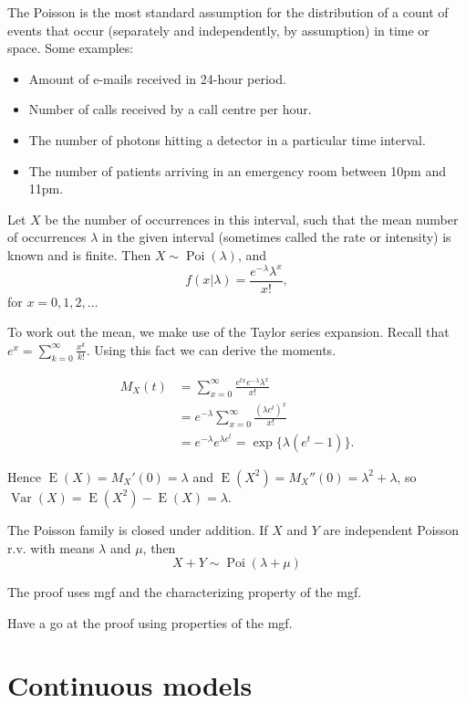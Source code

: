 \documentclass[
]{book}
\providecommand{\tightlist}{%
  \setlength{\itemsep}{0pt}\setlength{\parskip}{0pt}}
\DeclareMathOperator{\E}{E}
\DeclareMathOperator{\Var}{Var}
\DeclareMathOperator{\Pois}{Poi}
\theoremstyle{definition}
\theoremstyle{definition}
\theoremstyle{definition}
\theoremstyle{definition}
\theoremstyle{remark}
\begin{document}
The Poisson is the most standard assumption for the distribution of a count of events that occur (separately and independently, by assumption) in time or space. Some examples:

\begin{itemize}
\tightlist
\item
  Amount of e-mails received in 24-hour period.
\item
  Number of calls received by a call centre per hour.
\item
  The number of photons hitting a detector in a particular time interval.
\item
  The number of patients arriving in an emergency room between 10pm and 11pm.
\end{itemize}

Let \(X\) be the number of occurrences in this interval, such that the mean number of occurrences \(\lambda\) in the given interval (sometimes called the rate or intensity) is known and is finite. Then \(X\sim\Pois(\lambda)\), and
\[
f(x|\lambda) = \frac{e^{-\lambda}\lambda^x}{x!},
\]
for \(x=0,1,2,\dots\)

To work out the mean, we make use of the Taylor series expansion.
Recall that \(e^x=\sum_{k=0}^\infty \frac{x^k}{k!}\).
Using this fact we can derive the moments.

\begin{align*}
M_X(t)
&= \sum_{x=0}^\infty \frac{e^{tx} e^{-\lambda}\lambda^x}{x!} \\
&= e^{-\lambda} \sum_{x=0}^\infty \frac{(\lambda e^t)^x}{x!} \\
&= e^{-\lambda}e^{\lambda e^t} = \exp\{\lambda(e^t - 1) \}.
\end{align*}

Hence \(\E(X)=M_X'(0)=\lambda\) and \(\E(X^2)=M_X''(0)=\lambda^2+\lambda\), so \(\Var(X)=\E(X^2)-\E(X)=\lambda\).

The Poisson family is closed under addition.
If \(X\) and \(Y\) are independent Poisson r.v. with means \(\lambda\) and \(\mu\), then
\[
X+Y \sim \Pois(\lambda + \mu)
\]

The proof uses mgf and the characterizing property of the mgf.

Have a go at the proof using properties of the mgf.

\hypertarget{continuous-models}{%
\section{Continuous models}\label{continuous-models}}
\end{document}
